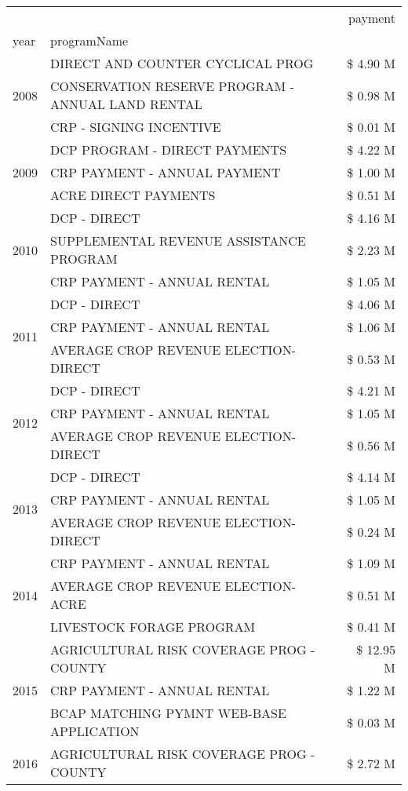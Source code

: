 \begin{tabular}{llr}
\toprule
 &  & payment \\
year & programName &  \\
\midrule
\multirow[t]{3}{*}{2008} & DIRECT AND COUNTER CYCLICAL PROG & \$ 4.90 M \\
 & CONSERVATION RESERVE PROGRAM - ANNUAL LAND RENTAL & \$ 0.98 M \\
 & CRP - SIGNING INCENTIVE & \$ 0.01 M \\
\cline{1-3}
\multirow[t]{3}{*}{2009} & DCP PROGRAM - DIRECT PAYMENTS & \$ 4.22 M \\
 & CRP PAYMENT - ANNUAL PAYMENT & \$ 1.00 M \\
 & ACRE DIRECT PAYMENTS & \$ 0.51 M \\
\cline{1-3}
\multirow[t]{3}{*}{2010} & DCP - DIRECT & \$ 4.16 M \\
 & SUPPLEMENTAL REVENUE ASSISTANCE PROGRAM & \$ 2.23 M \\
 & CRP PAYMENT - ANNUAL RENTAL & \$ 1.05 M \\
\cline{1-3}
\multirow[t]{3}{*}{2011} & DCP - DIRECT & \$ 4.06 M \\
 & CRP PAYMENT - ANNUAL RENTAL & \$ 1.06 M \\
 & AVERAGE CROP REVENUE ELECTION-DIRECT & \$ 0.53 M \\
\cline{1-3}
\multirow[t]{3}{*}{2012} & DCP - DIRECT & \$ 4.21 M \\
 & CRP PAYMENT - ANNUAL RENTAL & \$ 1.05 M \\
 & AVERAGE CROP REVENUE ELECTION-DIRECT & \$ 0.56 M \\
\cline{1-3}
\multirow[t]{3}{*}{2013} & DCP - DIRECT & \$ 4.14 M \\
 & CRP PAYMENT - ANNUAL RENTAL & \$ 1.05 M \\
 & AVERAGE CROP REVENUE ELECTION-DIRECT & \$ 0.24 M \\
\cline{1-3}
\multirow[t]{3}{*}{2014} & CRP PAYMENT - ANNUAL RENTAL & \$ 1.09 M \\
 & AVERAGE CROP REVENUE ELECTION-ACRE & \$ 0.51 M \\
 & LIVESTOCK FORAGE PROGRAM & \$ 0.41 M \\
\cline{1-3}
\multirow[t]{3}{*}{2015} & AGRICULTURAL RISK COVERAGE PROG - COUNTY & \$ 12.95 M \\
 & CRP PAYMENT - ANNUAL RENTAL & \$ 1.22 M \\
 & BCAP MATCHING PYMNT WEB-BASE APPLICATION & \$ 0.03 M \\
\cline{1-3}
\multirow[t]{3}{*}{2016} & AGRICULTURAL RISK COVERAGE PROG - COUNTY & \$ 2.72 M \\

\end{tabular}

